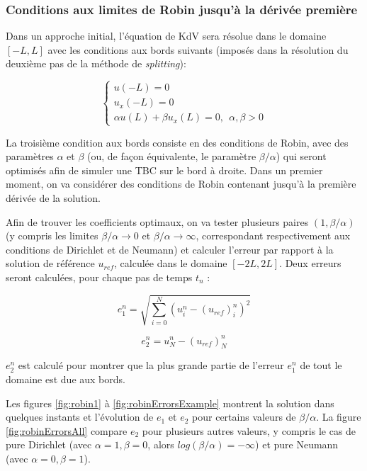 \subsubsection{Conditions aux limites de Robin jusqu'à la dérivée première}

\indent Dans un approche initial, l'équation de KdV sera résolue dans le domaine $[-L,L]$ avec les conditions aux bords suivants (imposés dans la résolution du deuxième pas de la méthode de \emph{splitting}):

\begin{equation*}
\begin{cases}
    u(-L) = 0 \\
    u_x(-L) = 0 \\
    \alpha u(L) + \beta u_x(L) = 0,  \ \ \alpha,\beta > 0
\end{cases}
\end{equation*}

\indent La troisième condition aux bords consiste en des conditions de Robin, avec des paramètres $\alpha$ et $\beta$ (ou, de façon équivalente, le paramètre  $\beta/\alpha$) qui seront optimisés afin de simuler une TBC sur le bord à droite. Dans un premier moment, on va considérer des conditions de Robin contenant jusqu'à la première dérivée de la solution.

\indent Afin de trouver les coefficients optimaux, on va tester plusieurs paires $(1,\beta/\alpha)$ (y compris les limites $\beta/\alpha \rightarrow 0$ et $\beta/\alpha \rightarrow \infty$, correspondant respectivement aux conditions de Dirichlet et de Neumann) et calculer l'erreur par rapport à la solution de référence $u_{ref}$, calculée dans le domaine $[-2L,2L]$. Deux erreurs seront calculées, pour chaque pas de temps $t_n$ :

\begin{equation*}
e_1^n = \sqrt{\sum_{i=0}^N{\left( u^n_i - (u_{ref})^n_i\right)^2}} 
\end{equation*}

\begin{equation*}
e_2^n =  u^n_N - (u_{ref})^n_N
\end{equation*}

\indent $e_2^n$ est calculé pour montrer que la plus grande partie de l'erreur $e_1^n$ de tout le domaine est due aux bords.
 
\indent Les figures \ref{fig:robin1} à \ref{fig:robinErrorsExample} montrent la solution dans quelques instants et l'évolution de $e_1$ et $e_2$ pour certains valeurs de $\beta/\alpha$. La figure \ref{fig:robinErrorsAll} compare $e_2$  pour plusieurs autres valeurs, y compris le cas de pure Dirichlet  (avec $\alpha = 1, \beta = 0$, alors $log(\beta/\alpha) = -\infty$) et pure Neumann (avec $\alpha = 0, \beta = 1$).

